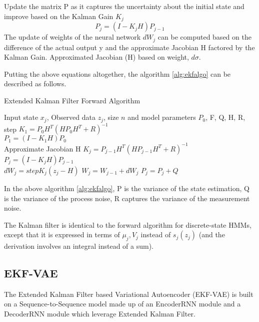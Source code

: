 \documentclass{article}
\begin{document}
Update the matrix P as it captures the uncertainty about the initial state and improve based on the Kalman Gain $K_{j}$
\begin{equation}
    P_{j} = (I - K_{j}H)P_{j-1} 
\end{equation}
The update of weights of the neural network $dW_{j}$ can be computed based on the difference of the actual output y and the approximate Jacobian H factored by the Kalman Gain. Approximated Jacobian (H) based on weight, $d\sigma$.

Putting the above equations altogether, the algorithm \ref{alg:ekfalgo} can be described as follows.

\begin{algorithm}[tbh]
   \caption{Extended Kalman Filter Forward Algorithm}
   \label{alg:ekfalgo}
\begin{algorithmic}
    Input state $x_{j}$, Observed data $z_j$, size $n$ and model parameters $P_{0}$, F, Q, H, R, step
   \STATE $ K_{1} = P_{0}H^{T}(HP_{0}H^{T} + R)^{-1} $ \\ 
   \STATE $ P_{1} = (I - K_{1}H)P_{0} $ \\ 
      \STATE Approximate Jacobian H
      \STATE $ K_{j} = P_{j-1}H^{T}(HP_{j-1}H^{T} + R)^{-1} $ \\
      \STATE $P_{j} = (I - K_{j}H)P_{j-1} $  \\
      \STATE $ dW_{j} = step K_{j} (z_{j} - H)$ 
      \STATE $W_{j} = W_{j-1} + dW_{j}$
        \STATE $P_{j} = P_{j} + Q$
      \ENDIF
   \ENDFOR 
\end{algorithmic}
\end{algorithm} 
In the above algorithm \ref{alg:ekfalgo}, P is the variance of the state estimation, Q is the variance of the process noise, R captures the variance of the measurement noise.

The Kalman filter is identical to the forward algorithm for discrete-state HMMs, except that it is expressed in terms of $\mu_{j}, V_{j}$ instead of $s_{j} (z_{j})$ (and the derivation involves an integral instead of a sum).

\subsection{EKF-VAE}
The Extended Kalman Filter based Variational Autoencoder (EKF-VAE) is built on a Sequence-to-Sequence model made up of an EncoderRNN module and a DecoderRNN module which leverage Extended Kalman Filter. 
\end{document}
